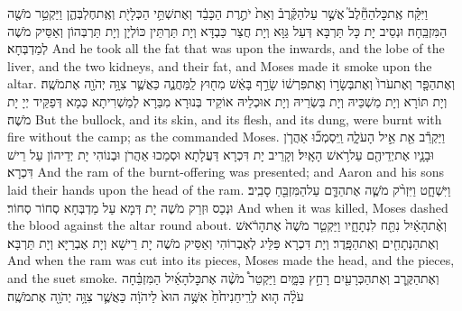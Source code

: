 {וַיִּקַּ֗ח אֶֽת\maqqaf כׇּל\maqqaf הַחֵ֘לֶב֮ אֲשֶׁ֣ר עַל\maqqaf הַקֶּ֒רֶב֒ וְאֵת֙ יֹתֶ֣רֶת הַכָּבֵ֔ד וְאֶת\maqqaf שְׁתֵּ֥י הַכְּלָיֹ֖ת וְאֶֽת\maqqaf חֶלְבְּהֶ֑ן וַיַּקְטֵ֥ר מֹשֶׁ֖ה הַמִּזְבֵּֽחָה׃}
{וּנְסֵיב יָת כָּל תַּרְבָּא דְּעַל גַּוָּא וְיָת חֲצַר כַּבְדָּא וְיָת תַּרְתֵּין כּוֹלְיָן וְיָת תַּרְבְּהוֹן וְאַסֵּיק מֹשֶׁה לְמַדְבְּחָא׃}
{And he took all the fat that was upon the inwards, and the lobe of the liver, and the two kidneys, and their fat, and Moses made it smoke upon the altar.}{}
{וְאֶת\maqqaf הַפָּ֤ר וְאֶת\maqqaf עֹרוֹ֙ וְאֶת\maqqaf בְּשָׂר֣וֹ וְאֶת\maqqaf פִּרְשׁ֔וֹ שָׂרַ֣ף בָּאֵ֔שׁ מִח֖וּץ לַֽמַּחֲנֶ֑ה כַּאֲשֶׁ֛ר צִוָּ֥ה יְהֹוָ֖ה אֶת\maqqaf מֹשֶֽׁה׃}
{וְיָת תּוֹרָא וְיָת מַשְׁכֵּיהּ וְיָת בִּשְׂרֵיהּ וְיָת אוּכְלֵיהּ אוֹקֵיד בְּנוּרָא מִבַּרָא לְמַשְׁרִיתָא כְּמָא דְּפַקֵּיד יְיָ יָת מֹשֶׁה׃}
{But the bullock, and its skin, and its flesh, and its dung, were burnt with fire without the camp; as the \lord\space commanded Moses.}{}
{וַיַּקְרֵ֕ב אֵ֖ת אֵ֣יל הָעֹלָ֑ה וַֽיִּסְמְכ֞וּ אַהֲרֹ֧ן וּבָנָ֛יו אֶת\maqqaf יְדֵיהֶ֖ם עַל\maqqaf רֹ֥אשׁ הָאָֽיִל׃}
{וְקָרֵיב יָת דִּכְרָא דַּעֲלָתָא וּסְמַכוּ אַהֲרֹן וּבְנוֹהִי יָת יְדֵיהוֹן עַל רֵישׁ דִּכְרָא׃}
{And the ram of the burnt-offering was presented; and Aaron and his sons laid their hands upon the head of the ram.}{}
{וַיִּשְׁחָ֑ט וַיִּזְרֹ֨ק מֹשֶׁ֧ה אֶת\maqqaf הַדָּ֛ם עַל\maqqaf הַמִּזְבֵּ֖חַ סָבִֽיב׃}
{וּנְכַס וּזְרַק מֹשֶׁה יָת דְּמָא עַל מַדְבְּחָא סְחוֹר סְחוֹר׃}
{And when it was killed, Moses dashed the blood against the altar round about.}{}
{וְאֶ֨ת\maqqaf הָאַ֔יִל נִתַּ֖ח לִנְתָחָ֑יו וַיַּקְטֵ֤ר מֹשֶׁה֙ אֶת\maqqaf הָרֹ֔אשׁ וְאֶת\maqqaf הַנְּתָחִ֖ים וְאֶת\maqqaf הַפָּֽדֶר׃}
{וְיָת דִּכְרָא פַּלֵּיג לְאֶבְרוֹהִי וְאַסֵּיק מֹשֶׁה יָת רֵישָׁא וְיָת אֶבְרַיָּא וְיָת תַּרְבָּא׃}
{And when the ram was cut into its pieces, Moses made the head, and the pieces, and the suet smoke.}{}
{וְאֶת\maqqaf הַקֶּ֥רֶב וְאֶת\maqqaf הַכְּרָעַ֖יִם רָחַ֣ץ בַּמָּ֑יִם וַיַּקְטֵר֩ מֹשֶׁ֨ה אֶת\maqqaf כׇּל\maqqaf הָאַ֜יִל הַמִּזְבֵּ֗חָה עֹלָ֨ה ה֤וּא לְרֵֽיחַ\maqqaf נִיחֹ֙חַ֙ אִשֶּׁ֥ה הוּא֙ לַיהֹוָ֔ה כַּאֲשֶׁ֛ר צִוָּ֥ה יְהֹוָ֖ה אֶת\maqqaf מֹשֶֽׁה׃}
